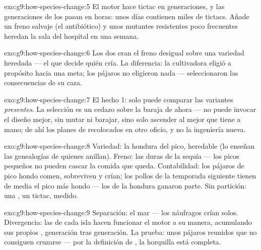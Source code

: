 \begin{solution}{exo:g9:how-species-change:5}
El motor hace tictac en generaciones, y las generaciones de los
 pasan en horas: unos días contienen miles de tictacs. Añade
un freno salvaje (el antibiótico) y unos mutantes resistentes poco
frecuentes heredan la sala del hospital en una semana.
\end{solution}

\begin{solution}{exo:g9:how-species-change:6}
Los dos eran el freno desigual sobre una variedad heredada --- el que
decide quién cría. La diferencia: la cultivadora eligió a propósito
hacia una meta; los pájaros no eligieron nada --- seleccionaron las
consecuencias de su caza.
\end{solution}

\begin{solution}{exo:g9:how-species-change:7}
El hecho 1: solo puede comparar las variantes \emph{presentes}. La
selección es un cedazo sobre la baraja de ahora --- no puede invocar el
diseño mejor, sin mutar ni barajar, sino solo ascender al mejor que
tiene a mano; de ahí los planes de  recolocados en otro
oficio, y no la ingeniería nueva.
\end{solution}

\begin{solution}{exo:g9:how-species-change:8}
Variedad: la hondura del pico, heredable (lo enseñan las genealogías de
quienes anillan). Freno: las  duras de la sequía --- los picos
pequeños no pueden cascar la comida que queda. Contabilidad: los
pájaros de pico hondo comen, sobreviven y crían; los pollos de la
temporada siguiente tienen de media el pico más hondo --- los  de
la hondura ganaron parte. Sin partición: una , un tictac,
medido.
\end{solution}

\begin{solution}{exo:g9:how-species-change:9}
Separación: el mar --- los náufragos crían solos. Divergencia: las
 de cada isla hacen funcionar el motor a su manera,
acumulando sus propios , generación tras generación. La prueba:
unos pájaros reunidos que no consiguen cruzarse --- por la definición
de , la horquilla está completa.
\end{solution}

